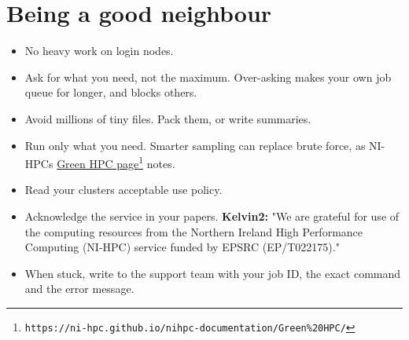 \section{Being a good neighbour}\label{being-a-good-neighbour}

\begin{itemize}
\tightlist
\item
  No heavy work on login nodes.
\item
  Ask for what you need, not the maximum. Over-asking makes your own job queue for longer, and blocks others.
\item
  Avoid millions of tiny files. Pack them, or write summaries.
\item
  Run only what you need. Smarter sampling can replace brute force, as NI-HPC\textquotesingle s \href{https://ni-hpc.github.io/nihpc-documentation/Green\%20HPC/}{Green HPC page}\footnote{\texttt{https://ni-hpc.github.io/nihpc-documentation/Green\%20HPC/}} notes.
\item
  Read your cluster\textquotesingle s acceptable use policy.
\item
  Acknowledge the service in your papers. \textbf{Kelvin2:} "We are grateful for use of the computing resources from the Northern Ireland High Performance Computing (NI-HPC) service funded by EPSRC (EP/T022175)."
\item
  When stuck, write to the support team with your job ID, the exact command and the error message.
\end{itemize}

